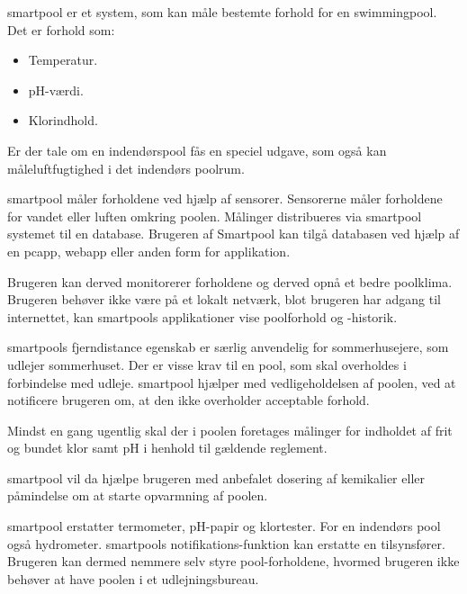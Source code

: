 \gls{smartpool} er et system, som kan måle bestemte forhold for en swimmingpool. 
Det er forhold som:

\begin{itemize}
	\item Temperatur.
	\item pH-værdi.
	\item Klorindhold.
\end{itemize}

Er der tale om en indendørspool fås en speciel udgave, som også kan måleluftfugtighed i det indendørs poolrum.

\gls{smartpool} måler forholdene ved hjælp af sensorer. Sensorerne måler forholdene for vandet eller luften omkring poolen. Målinger distribueres via \gls{smartpool} systemet til en database. Brugeren af Smartpool kan tilgå databasen ved hjælp af en \gls{pcapp}, \gls{webapp} eller anden form for applikation. 

Brugeren kan derved monitorerer forholdene og derved opnå et bedre poolklima. Brugeren behøver ikke være på et lokalt netværk, blot brugeren har adgang til internettet, kan \glspl{smartpool} applikationer vise poolforhold og -historik. 

\glspl{smartpool} fjerndistance egenskab er særlig anvendelig for sommerhusejere, som udlejer sommerhuset. Der er visse krav til en pool, som skal overholdes i forbindelse med udleje. \gls{smartpool} hjælper med vedligeholdelsen af poolen, ved at notificere brugeren om, at den ikke overholder acceptable forhold. 

Mindst en gang ugentlig skal der i poolen foretages målinger for indholdet af frit og bundet klor samt pH i henhold til gældende reglement.

\gls{smartpool} vil da hjælpe brugeren med anbefalet dosering af kemikalier eller påmindelse om at starte opvarmning af poolen.

\gls{smartpool} erstatter termometer, pH-papir og klortester. For en indendørs pool også hydrometer. \glspl{smartpool} notifikations-funktion kan erstatte en tilsynsfører. Brugeren kan dermed nemmere selv styre pool-forholdene, hvormed brugeren ikke behøver at have poolen i et udlejningsbureau.
